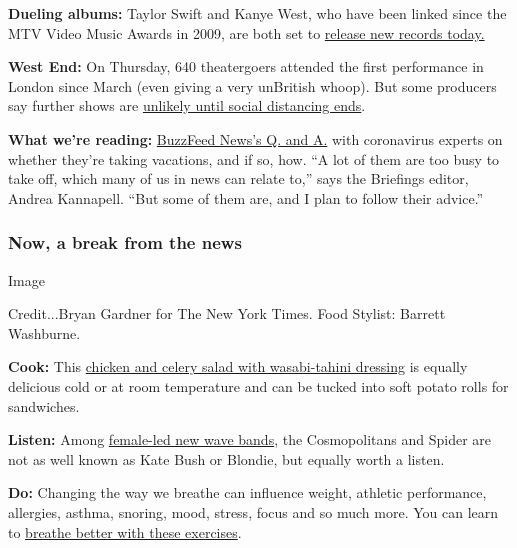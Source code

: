 \textbf{Dueling albums:} Taylor Swift and Kanye West, who have been
linked since the MTV Video Music Awards in 2009, are both set to
\href{https://www.nytimes.com/2020/07/23/arts/music/taylor-swift-kanye-west.html}{release
new records today.}

\textbf{West End:} On Thursday, 640 theatergoers attended the first
performance in London since March (even giving a very unBritish whoop).
But some producers say further shows are
\href{https://www.nytimes.com/2020/07/23/theater/west-end-london-virus.html}{unlikely
until social distancing ends}.

\textbf{What we're reading:}
\href{https://www.buzzfeednews.com/article/davidmack/summer-travel-during-coronavirus}{BuzzFeed
News's Q. and A.} with coronavirus experts on whether they're taking
vacations, and if so, how. ``A lot of them are too busy to take off,
which many of us in news can relate to,'' says the Briefings editor,
Andrea Kannapell. ``But some of them are, and I plan to follow their
advice.''

\hypertarget{now-a-break-from-the-news}{%
\subsubsection{Now, a break from the
news}\label{now-a-break-from-the-news}}

Image

Credit...Bryan Gardner for The New York Times. Food Stylist: Barrett
Washburne.

\textbf{Cook:} This
\href{https://www.nytimes.com/2020/07/20/dining/celery-chicken-salad-recipe.html?action=click\&module=RelatedLinks\&pgtype=collection}{chicken
and celery salad with wasabi-tahini dressing} is equally delicious cold
or at room temperature and can be tucked into soft potato rolls for
sandwiches.

\textbf{Listen:} Among
\href{https://www.nytimes.com/2020/07/22/arts/music/women-new-wave-playlist.html?action=click\&module=RelatedLinks\&pgtype=collection}{female-led
new wave bands}, the Cosmopolitans and Spider are not as well known as
Kate Bush or Blondie, but equally worth a listen.

\textbf{Do:} Changing the way we breathe can influence weight, athletic
performance, allergies, asthma, snoring, mood, stress, focus and so much
more. You can learn to
\href{https://www.nytimes.com/2020/07/18/at-home/coronavirus-breathing-exercises.html?action=click\&module=RelatedLinks\&pgtype=collection}{breathe
better with these exercises}.

